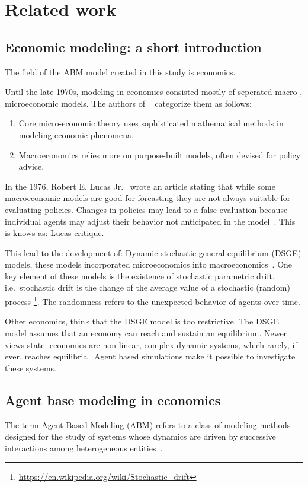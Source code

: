 \section{Related work}

\subsection{Economic modeling: a short introduction}\label{subsec:economic-modeling}
The field of the ABM model created in this study is economics.

Until the late 1970s, modeling in economics consisted mostly of seperated macro-, microeconomic models.
The authors of ~\cite{morgan2012models} categorize them as follows:

\begin{enumerate}
  \item Core micro-economic theory uses sophisticated mathematical methods in modeling economic phenomena.
  \item Macroeconomics relies more on purpose-built models, often devised for policy advice.
\end{enumerate}

In the 1976, Robert E. Lucas Jr.~\cite{lucas1976econometric} wrote an article stating that while some macroeconomic models are good for forcasting
they are not always suitable for evaluating policies.
Changes in policies may lead to a false evaluation because individual agents may adjust their behavior not anticipated in the model~\cite{HURTADO2014S12}.
This is knows as: Lucas critique.

This lead to the development of: Dynamic stochastic general equilibrium (DSGE) models, these models incorporated microeconomics into macroeconomics~\cite{moos2019facts}.
One key element of these models is the existence of stochastic parametric drift, i.e.\ stochastic drift is the change of the average value of a stochastic (random) process \footnote{\url{https://en.wikipedia.org/wiki/Stochastic_drift}}.
The randomness refers to the unexpected behavior of agents over time.

Other economics, think that the DSGE model is too restrictive.
The DSGE model assumes that an economy can reach and sustain an equilibrium.
Newer views state: economies are non-linear, complex dynamic systems, which rarely, if ever, reaches equilibria~\cite{hamill2016agent}
Agent based simulations make it possible to investigate these systems.

\subsection{Agent base modeling in economics}\label{subsec:agent-base-modeling}
The term Agent-Based Modeling (ABM) refers to a class of modeling methods designed for the study of systems whose dynamics are driven by successive interactions among heterogeneous entities~\cite{tesfatsion2023agent}.

